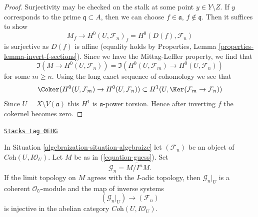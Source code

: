 \begin{proof}
Surjectivity may be checked on the stalk at some point $y \in Y \setminus Z$.
If $y$ corresponds to the prime $\mathfrak q \subset A$, then we can
choose $f \in \mathfrak a$, $f \not \in \mathfrak q$. Then it suffices
to show
$$
M_f \longrightarrow H^0(U, \mathcal{F}_n)_f = H^0(D(f), \mathcal{F}_n)
$$
is surjective as $D(f)$ is affine (equality holds by Properties,
Lemma \ref{properties-lemma-invert-f-sections}). Since we have the
Mittag-Leffler property, we find that
$$
\Im(M \to H^0(U, \mathcal{F}_n)) =
\Im(H^0(U, \mathcal{F}_m) \to H^0(U, \mathcal{F}_n))
$$
for some $m \geq n$. Using the long exact sequence of cohomology we see
that
$$
\Coker(H^0(U, \mathcal{F}_m) \to H^0(U, \mathcal{F}_n))
\subset
H^1(U, \Ker(\mathcal{F}_m \to \mathcal{F}_n))
$$
Since $U = X \setminus V(\mathfrak a)$ this $H^1$ is $\mathfrak a$-power
torsion. Hence after inverting $f$ the cokernel becomes zero.
\end{proof}

\begin{lemma}
\label{algebraization-lemma-when-topology}
\href{https://stacks.math.columbia.edu/tag/0EHG}{\texttt{Stacks tag 0EHG}}

In Situation \ref{algebraization-situation-algebraize} let $(\mathcal{F}_n)$ be an object
of $\textit{Coh}(U, I\mathcal{O}_U)$. Let $M$ be as in (\ref{equation-guess}).
Set
$$
\mathcal{G}_n = \widetilde{M/I^nM}.
$$
If the limit topology on $M$ agrees with the $I$-adic topology, then
$\mathcal{G}_n|_U$ is a coherent
$\mathcal{O}_U$-module and the map of inverse systems
$$
(\mathcal{G}_n|_U) \longrightarrow (\mathcal{F}_n)
$$
is injective in the abelian category $\textit{Coh}(U, I\mathcal{O}_U)$.
\end{lemma}

